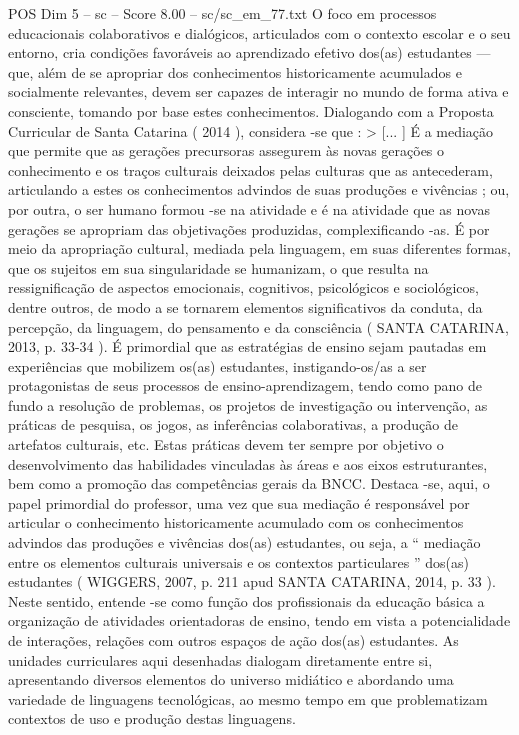 \begin{textsample}{POS Dim 5 – sc – Score 8.00 – sc/sc\_em\_77.txt}
O foco em processos educacionais colaborativos e dialógicos, articulados com o contexto escolar e o seu entorno, cria condições favoráveis ao aprendizado efetivo dos(as) estudantes — que, além de se apropriar dos conhecimentos historicamente acumulados e socialmente relevantes, devem ser capazes de interagir no mundo de forma ativa e consciente, tomando por base estes conhecimentos.
Dialogando com a Proposta Curricular de Santa Catarina ( 2014 ), considera -se que : > [... ] É a mediação que permite que as gerações precursoras assegurem às novas gerações o conhecimento e os traços culturais deixados pelas culturas que as antecederam, articulando a estes os conhecimentos advindos de suas produções e vivências ; ou, por outra, o ser humano formou -se na atividade e é na atividade que as novas gerações se apropriam das objetivações produzidas, complexificando -as.
É por meio da apropriação cultural, mediada pela linguagem, em suas diferentes formas, que os sujeitos em sua singularidade se humanizam, o que resulta na ressignificação de aspectos emocionais, cognitivos, psicológicos e sociológicos, dentre outros, de modo a se tornarem elementos significativos da conduta, da percepção, da linguagem, do pensamento e da consciência ( SANTA CATARINA, 2013, p. 33-34 ).
É primordial que as estratégias de ensino sejam pautadas em experiências que mobilizem os(as) estudantes, instigando-os/as a ser protagonistas de seus processos de ensino-aprendizagem, tendo como pano de fundo a resolução de problemas, os projetos de investigação ou intervenção, as práticas de pesquisa, os jogos, as inferências colaborativas, a produção de artefatos culturais, etc.
Estas práticas devem ter sempre por objetivo o desenvolvimento das habilidades vinculadas às áreas e aos eixos estruturantes, bem como a promoção das competências gerais da BNCC.
Destaca -se, aqui, o papel primordial do professor, uma vez que sua mediação é responsável por articular o conhecimento historicamente acumulado com os conhecimentos advindos das produções e vivências dos(as) estudantes, ou seja, a “ mediação entre os elementos culturais universais e os contextos particulares ” dos(as) estudantes ( WIGGERS, 2007, p. 211 apud SANTA CATARINA, 2014, p. 33 ).
Neste sentido, entende -se como função dos profissionais da educação básica a organização de atividades orientadoras de ensino, tendo em vista a potencialidade de interações, relações com outros espaços de ação dos(as) estudantes.
As unidades curriculares aqui desenhadas dialogam diretamente entre si, apresentando diversos elementos do universo midiático e abordando uma variedade de linguagens tecnológicas, ao mesmo tempo em que problematizam contextos de uso e produção destas linguagens.

\end{textsample}
